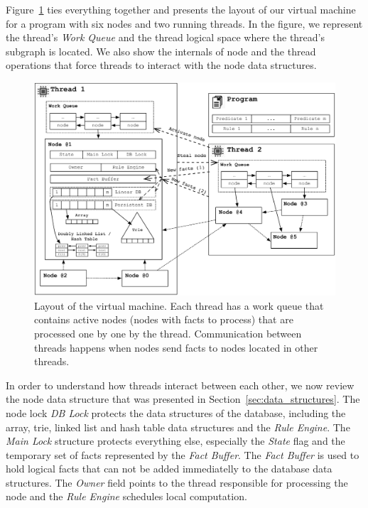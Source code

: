 Figure~\ref{fig:implementation:vm_overview} ties everything together and
presents the layout of our virtual machine for a program with six nodes and two
running threads. In the figure, we represent the thread's \emph{Work Queue} and
the thread logical space where the thread's subgraph is located. We also show
the internals of node  and the thread operations that force threads to
interact with the node data structures.

\begin{figure}[t]
\centering
\includegraphics[width=\textwidth]{figures/implementation/vm_overview.pdf}
\caption{Layout of the virtual machine. Each thread has a work queue that
   contains active nodes (nodes with facts to process) that are processed one
   by one by the thread. Communication between threads happens when nodes
   send facts to nodes located in other threads.}
\label{fig:implementation:vm_overview}
\end{figure}

In order to understand how threads interact between each other, we now review
the node data structure that was presented in Section~\ref{sec:data_structures}.
The node lock \emph{DB Lock} protects the data structures of the database,
including the array, trie, linked list and hash table data structures and the
\emph{Rule Engine}. The \emph{Main Lock} structure protects everything else,
especially the \emph{State} flag and the temporary set of facts represented by
the \emph{Fact Buffer}. The \emph{Fact Buffer} is used to hold logical facts
that can not be added immediatelly to the database data structures. The
\emph{Owner} field points to the thread responsible for processing the node and
the \emph{Rule Engine} schedules local computation.

